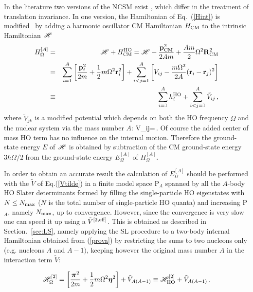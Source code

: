 In the literature two versions of the NCSM exist , which differ in the treatment of translation invariance.
In one version, the Hamiltonian of Eq.~(\ref{Hint})
is modified~\cite{ShF74} by adding a harmonic oscillator CM Hamiltonian $H_{\rm CM}$ to the intrinsic Hamiltonian $\cal H$
 \begin{eqnarray}
H^{[A]}_\Omega &=& {\cal H} + H_{\rm CM}^{\rm HO} = {\cal H} +  \frac {\mathbf{p}_{\rm \rm CM}^2} {2Am} + 
{\frac{Am}{2}} \Omega^2 {\bf R}_{\rm CM}^2 \\
\label{prova}
 &=& \sum_{i=1}^A \left[ {\frac{{\bf p}_i^2}{2m}}
+\frac{1}{2}m\Omega^2 {\bf r}^2_i
\right] + \sum_{i<j=1}^A \left[ V_{ij}
-\frac{m\Omega^2}{2A}
({\bf r}_i-{\bf r}_j)^2 
\right]\\
&\equiv& \sum_{i=1}^A h_i^{\rm HO} + \sum_{i<j=1}^A\tilde V_{ij} \,,
\label{HOmega}
\end{eqnarray}
where $\tilde V_{jk}$ is a modified potential which depends  on  both the HO frequency $\Omega$ and the nuclear 
system via the mass number $A$: 
\be
\label{Vtilde}
\tilde V_{ij}=\,.
\ee
Of course the added center of mass HO term has no influence on the internal motion. 
Therefore the ground-state energy $E$ of ${\cal H}$ is obtained
by subtraction of the CM ground-state energy $3\hbar \Omega/2$ from the ground-state energy 
$E^{[A]}_\Omega$ of $H^{[A]}_\Omega$. 

In order to obtain an accurate result the calculation of $E^{[A]}_\Omega$  should be  performed with the $\tilde V$ of Eq.(\ref{Vtilde})
in a finite model space  P${\!_A}$ spanned
by all the $A$-body HO Slater determinants formed by filling the single-particle HO eigenstates
with $N\leq N_{\rm max}$ ($N$ is the total number of single-particle HO quanta) and increasing  
P${\!_A}$, namely $N_{\rm max}$, up to convergence. However, since the convergence is very slow one can speed it up
using a $\tilde V^{\rm [2,eff]}$. This is obtained as described in Section.~\ref{sec:LS}, namely applying the SL procedure
to a two-body internal Hamiltonian obtained from (\ref{prova}) 
by restricting the sums to two nucleons only (e.g. nucleons $A$ and $A-1)$, keeping however the original mass number $A$ 
in the interaction term $\tilde V$:

\begin{equation}\label{HO2mega}
{\cal H}^{[2]}_\Omega = \left[ \frac{\bm{\pi}^2}{2 m}
+\frac{1}{2}m\Omega^2 \bm{\eta}^2\right ]+
\tilde V_{A(A-1)}
\equiv {\cal H}^{[2]}_{\rm HO} +\tilde V_{A(A-1)}  \,.
\end{equation}

